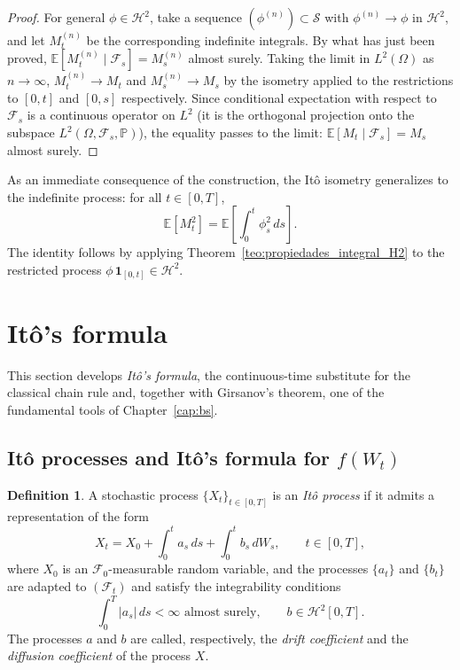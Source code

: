 \documentclass[11pt,a4paper,oneside]{report}
\theoremstyle{plain}
\theoremstyle{definition}
\newtheorem{definicion}[teorema]{Definition}
\theoremstyle{remark}
\newcommand{\E}{\mathbb{E}}
\newcommand{\PP}{\mathbb{P}}
\newcommand{\F}{\mathcal{F}}
\newcommand{\1}{\mathbf{1}}
\begin{document}
\begin{proof}
For general $\phi \in \mathcal{H}^2$, take a sequence
$(\phi^{(n)}) \subset \mathcal{S}$ with $\phi^{(n)} \to \phi$ in
$\mathcal{H}^2$, and let $M_t^{(n)}$ be the corresponding indefinite
integrals. By what has just been proved,
$\E[M_t^{(n)} \mid \F_s] = M_s^{(n)}$ almost surely. Taking the limit
in $L^2(\Omega)$ as $n \to \infty$, $M_t^{(n)} \to M_t$ and
$M_s^{(n)} \to M_s$ by the isometry applied to the restrictions to
$[0, t]$ and $[0, s]$ respectively. Since conditional expectation
with respect to $\F_s$ is a continuous operator on $L^2$ (it is the
orthogonal projection onto the subspace $L^2(\Omega, \F_s, \PP)$), the
equality passes to the limit: $\E[M_t \mid \F_s] = M_s$ almost
surely.
\end{proof}

As an immediate
consequence of the construction, the Itô isometry generalizes to the
indefinite process: for all $t \in [0, T]$,
\begin{equation}\label{eq:isometria_proceso}
  \E[M_t^2] = \E\!\left[\int_0^t \phi_s^2\, ds\right].
\end{equation}
The identity follows by applying
Theorem~\ref{teo:propiedades_integral_H2} to the restricted process
$\phi\, \mathbf{1}_{[0, t]} \in \mathcal{H}^2$.
\section{Itô's formula}
\label{sec:formula_ito}

This section develops \emph{Itô's formula}, the continuous-time
substitute for the classical chain rule and, together with Girsanov's
theorem, one of the fundamental tools of Chapter~\ref{cap:bs}.

\subsection{Itô processes and Itô's formula for $f(W_t)$}
\label{subsec:procesos_ito_y_formula}

\begin{definicion}
\label{def:proceso_ito}
A stochastic process $\{X_t\}_{t \in [0, T]}$ is an \emph{Itô
process} if it admits a representation of the form
\begin{equation}\label{eq:def_proceso_ito}
  X_t = X_0 + \int_0^t a_s\, ds + \int_0^t b_s\, dW_s,
  \qquad t \in [0, T],
\end{equation}
where $X_0$ is an $\F_0$-measurable random variable, and the
processes $\{a_t\}$ and $\{b_t\}$ are adapted to $(\F_t)$ and satisfy
the integrability conditions
\begin{equation*}
  \int_0^T |a_s|\, ds < \infty \text{ almost surely},
  \qquad b \in \mathcal{H}^2[0, T].
\end{equation*}
The processes $a$ and $b$ are called, respectively, the \emph{drift
coefficient} and the \emph{diffusion coefficient} of the process $X$.
\end{definicion}
\end{document}
